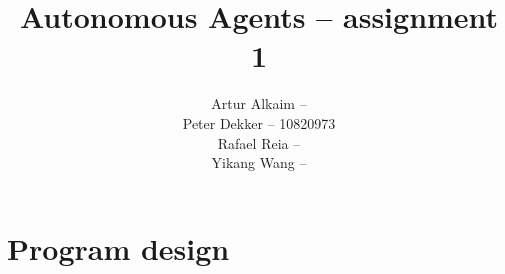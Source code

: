 \documentclass{article}
\begin{document}
\title{Autonomous Agents -- assignment 1}
\author{
Artur Alkaim --\\
Peter Dekker -- 10820973\\
Rafael Reia --\\
Yikang Wang -- \\
}
\maketitle
\section{Program design}
\end{document}
